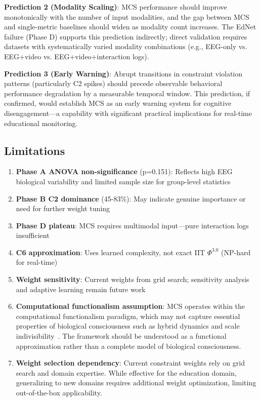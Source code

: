 \documentclass[10pt,journal,compsoc]{IEEEtran}
\begin{document}
\textbf{Prediction 2 (Modality Scaling)}: MCS performance should improve monotonically with the number of input modalities, and the gap between MCS and single-metric baselines should widen as modality count increases. The EdNet failure (Phase D) supports this prediction indirectly; direct validation requires datasets with systematically varied modality combinations (e.g., EEG-only vs. EEG+video vs. EEG+video+interaction logs).

\textbf{Prediction 3 (Early Warning)}: Abrupt transitions in constraint violation patterns (particularly C2 spikes) should precede observable behavioral performance degradation by a measurable temporal window. This prediction, if confirmed, would establish MCS as an early warning system for cognitive disengagement—a capability with significant practical implications for real-time educational monitoring.

\subsection{Limitations}

\begin{enumerate}
    \item \textbf{Phase A ANOVA non-significance} (p=0.151): Reflects high EEG biological variability and limited sample size for group-level statistics
    \item \textbf{Phase B C2 dominance} (45-83\%): May indicate genuine importance or need for further weight tuning
    \item \textbf{Phase D plateau}: MCS requires multimodal input—pure interaction logs insufficient
    \item \textbf{C6 approximation}: Uses learned complexity, not exact IIT $\Phi^{3.0}$ (NP-hard for real-time)~\cite{oizumi2014}
    \item \textbf{Weight sensitivity}: Current weights from grid search; sensitivity analysis and adaptive learning remain future work
    \item \textbf{Computational functionalism assumption}: MCS operates within the computational functionalism paradigm, which may not capture essential properties of biological consciousness such as hybrid dynamics and scale indivisibility~\cite{Milinkovic2025}. The framework should be understood as a functional approximation rather than a complete model of biological consciousness.
    \item \textbf{Weight selection dependency}: Current constraint weights rely on grid search and domain expertise. While effective for the education domain, generalizing to new domains requires additional weight optimization, limiting out-of-the-box applicability.
\end{enumerate}
\end{document}
